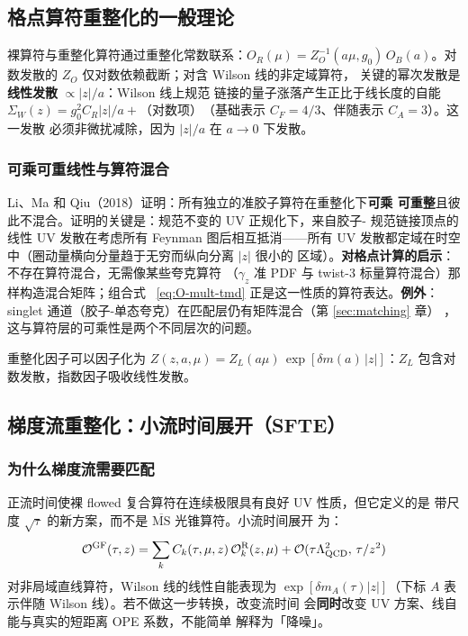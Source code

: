 \documentclass[11pt,a4paper]{ctexart}
\newcommand{\MSbarM}{\overline{\text{MS}}}
\newcommand{\abs}[1]{\lvert #1\rvert}
\newcommand{\order}[1]{\mathcal{O}(#1)}
\begin{document}
\subsection{格点算符重整化的一般理论}

裸算符与重整化算符通过重整化常数联系：$O_R(\mu)=Z_O^{-1}(a\mu,g_0)\,
O_B(a)$。对数发散的 $Z_O$ 仅对数依赖截断；对含 Wilson 线的非定域算符，
关键的幂次发散是\textbf{线性发散} $\propto\abs{z}/a$：Wilson 线上规范
链接的量子涨落产生正比于线长度的自能 $\Sigma_W(z)=g_0^2 C_R \abs{z}/a
+\text{（对数项）}$（基础表示 $C_F=4/3$、伴随表示 $C_A=3$）。这一发散
必须非微扰减除，因为 $\abs{z}/a$ 在 $a\to0$ 下发散。

\subsubsection{可乘可重线性与算符混合}

Li、Ma 和 Qiu（2018）证明：所有独立的准胶子算符在重整化下\textbf{可乘
可重整}且彼此不混合。证明的关键是：规范不变的 UV 正规化下，来自胶子-
规范链接顶点的线性 UV 发散在考虑所有 Feynman 图后相互抵消——所有 UV
发散都定域在时空中（圈动量横向分量趋于无穷而纵向分离 $\abs{z}$ 很小的
区域）。\textbf{对格点计算的启示}：不存在算符混合，无需像某些夸克算符
（$\gamma_z$ 准 PDF 与 twist-3 标量算符混合）那样构造混合矩阵；组合式
~\eqref{eq:O-mult-tmd} 正是这一性质的算符表达。\textbf{例外}：singlet
通道（胶子-单态夸克）在匹配层仍有矩阵混合（第 \ref{sec:matching} 章）
，这与算符层的可乘性是两个不同层次的问题。

重整化因子可以因子化为 $Z(z,a,\mu)=Z_L(a\mu)\,
\exp[\delta m(a)\,\abs{z}]$：$Z_L$ 包含对数发散，指数因子吸收线性发散。

\subsection{梯度流重整化：小流时间展开（SFTE）}
\label{sec:sfte}

\subsubsection{为什么梯度流需要匹配}

正流时间使裸 flowed 复合算符在连续极限具有良好 UV 性质，但它定义的是
带尺度 $\sqrt{\tau}$ 的新方案，而不是 $\MSbarM$ 光锥算符。小流时间展开
为：
\begin{equation}\label{eq:sfte}
\mathcal O^{\rm GF}(\tau,z) = \sum_k C_k(\tau,\mu,z)\,
\mathcal O_k^{\rm R}(z,\mu) + \order{\tau\Lambda_{\rm QCD}^2,\,
\tau/z^2}
\end{equation}
对非局域直线算符，Wilson 线的线性自能表现为 $\exp[\delta m_A(\tau)
\abs{z}]$（下标 $A$ 表示伴随 Wilson 线）。若不做这一步转换，改变流时间
会\textbf{同时}改变 UV 方案、线自能与真实的短距离 OPE 系数，不能简单
解释为「降噪」。
\end{document}

